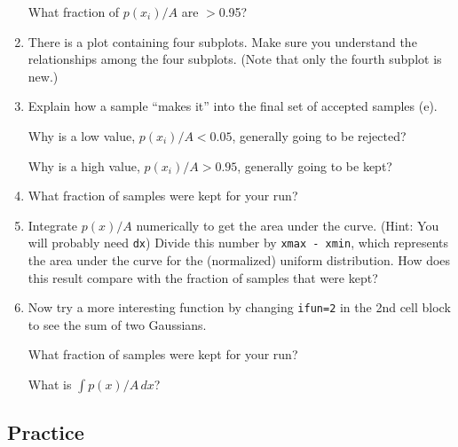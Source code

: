 \documentclass[11pt,titlepage,fleqn]{article}
\begin{document}
\begin{enumerate}
What fraction of $p(x_i)/A$ are $>$0.95?

\vertgap

\item There is a plot containing four subplots. Make sure you understand the relationships among the four subplots. (Note that only the fourth subplot is new.)

\vertgap

\item Explain how a sample ``makes it'' into the final set of accepted samples (e).

Why is a low value, $p(x_i)/A < 0.05$, generally going to be rejected?

Why is a high value, $p(x_i)/A > 0.95$, generally going to be kept?

\vertgap

\item What fraction of samples were kept for your run?

\vertgap

\item Integrate $p(x)/A$ numerically to get the area under the curve. (Hint: You will probably need \verb+dx+) Divide this number by \verb+xmax - xmin+, which represents the area under the curve for the (normalized) uniform distribution. How does this result compare with the fraction of samples that were kept?

\vertgap

\item Now try a more interesting function by changing \verb+ifun=2+ in the 2nd cell block to see the sum of two Gaussians.

What fraction of samples were kept for your run?

What is $\int p(x)/A \, dx$?

\end{enumerate}


\subsection*{Practice}
\end{document}
